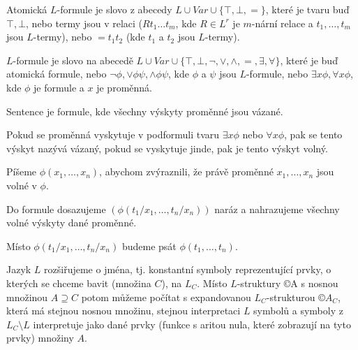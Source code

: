 \documentclass[12pt]{article}                   %
\begin{document}
        \begin{definice}
            Atomická $L$-formule je slovo z abecedy $L \cup Var \cup \{\top, \bot, =\}$, které je tvaru buď $\top, \bot$, nebo termy jsou v relaci ($Rt_1…t_m$, kde $R \in L^r$ je $m$-nární relace a $t_1, …, t_m$ jsou $L$-termy), nebo $=t_1t_2$ (kde $t_1$ a $t_2$ jsou $L$-termy).
        \end{definice}

        \begin{definice}
            $L$-formule je slovo na abecedě $L \cup Var \cup \{\top, \bot, \neg, \lor, \land, =, \exists, \forall\}$, které je buď atomická formule, nebo $\neg\phi, \lor\phi\psi, \land\phi\psi$, kde $\phi$ a $\psi$ jsou $L$-formule, nebo $\exists x\phi, \forall x\phi$, kde $\phi$ je formule a $x$ je proměnná.
            
            Sentence je formule, kde všechny výskyty proměnné jsou vázané.
        \end{definice}

        \begin{definice}
            Pokud se proměnná vyskytuje v podformuli tvaru $\exists x \phi$ nebo $\forall x \phi$, pak se tento výskyt nazývá vázaný, pokud se vyskytuje jinde, pak je tento výskyt volný.
        \end{definice}

        \begin{definice}
            Píšeme $\phi(x_1, …, x_n)$, abychom zvýraznili, že právě proměnné $x_1, …, x_n$ jsou volné v $\phi$.

            Do formule dosazujeme $(\phi(t_1/x_1, …, t_n/x_n))$ naráz a nahrazujeme všechny volné výskyty dané proměnné.

            Místo $\phi(t_1/x_1, …, t_n/x_n)$ budeme psát $\phi(t_1, …, t_n)$.
        \end{definice}

        \begin{definice}
            Jazyk $L$ rozšiřujeme o jména, tj. konstantní symboly reprezentující prvky, o kterých se chceme bavit (množina $C$), na $L_C$. Místo $L$-struktury ©A s nosnou množinou $A \supseteq C$ potom můžeme počítat s expandovanou $L_C$-strukturou $©A_C$, která má stejnou nosnou množinu, stejnou interpretaci $L$ symbolů a symboly z $L_C \setminus L$ interpretuje jako dané prvky (funkce s aritou nula, které zobrazují na tyto prvky) množiny $A$.
        \end{definice}
\end{document}

